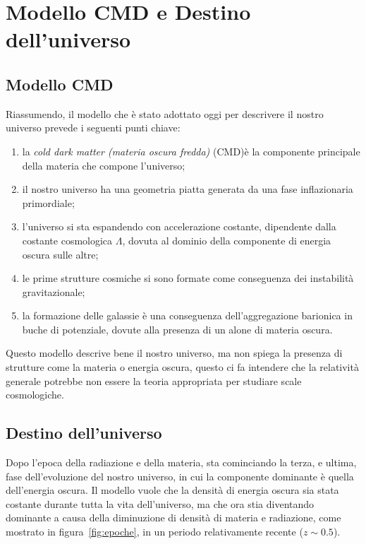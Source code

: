 \section{Modello CMD e Destino dell'universo}\label{sec:modello-CDM-destino}

\subsection{Modello CMD}\label{sec:modello-CDM}
Riassumendo, il modello che è stato adottato oggi per descrivere il nostro universo prevede i seguenti punti chiave:
\begin{enumerate}
    \item la \textit{cold dark matter (materia oscura fredda)} (CMD)è la componente principale della materia che compone l'universo;
    \item il nostro universo ha una geometria piatta generata da una fase inflazionaria primordiale;
    \item l'universo si sta espandendo con accelerazione costante, dipendente dalla costante cosmologica $\Lambda$, dovuta al dominio della componente di energia oscura sulle altre;
    \item le prime strutture cosmiche si sono formate come conseguenza dei instabilità gravitazionale;
    \item la formazione delle galassie è una conseguenza dell'aggregazione barionica in buche di potenziale, dovute alla presenza di un alone di materia oscura.
\end{enumerate}

Questo modello descrive bene il nostro universo, ma non spiega la presenza di strutture come la materia o energia oscura, questo ci fa intendere che la relatività generale potrebbe non essere la teoria appropriata per studiare scale cosmologiche.

\subsection{Destino dell'universo}\label{sec:destino}

Dopo l'epoca della radiazione e della materia, sta cominciando la terza, e ultima, fase dell'evoluzione del nostro universo, in cui la componente dominante è quella dell'energia oscura. Il modello vuole che la densità di energia oscura sia stata costante durante tutta la vita dell'universo, ma che ora stia diventando dominante a causa della diminuzione di densità di materia e radiazione, come mostrato in figura~\ref{fig:epoche}, in un periodo relativamente recente ($z \sim 0.5$).

